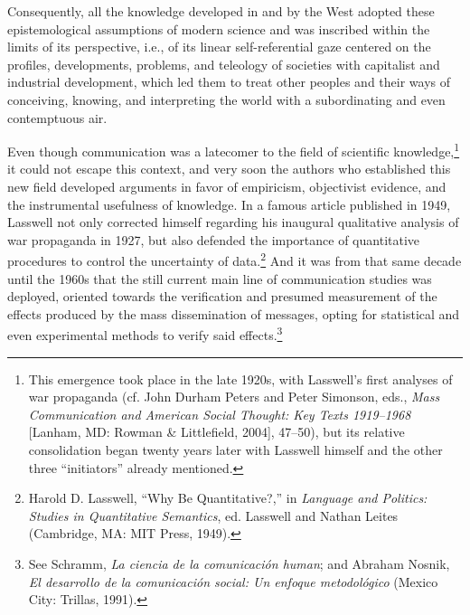 \documentclass{tufte-handout}
\begin{document}
Consequently, all the knowledge developed in and by the West adopted
these epistemological assumptions of modern science and was inscribed
within the limits of its perspective, i.e., of its linear
self-referential gaze centered on the profiles, developments, problems,
and teleology of societies with capitalist and industrial development,
which led them to treat other peoples and their ways of conceiving,
knowing, and interpreting the world with a subordinating and even
contemptuous air.

Even though communication was a latecomer to the field of scientific
knowledge,\footnote{This emergence took place in the late 1920s, with
  Lasswell's first analyses of war propaganda (cf. John Durham Peters
  and Peter Simonson, eds., \emph{Mass Communication and American Social
  Thought: Key Texts 1919--1968} {[}Lanham, MD: Rowman \& Littlefield,
  2004{]}, 47--50), but its relative consolidation began twenty years
  later with Lasswell himself and the other three ``initiators'' already
  mentioned.} it could not escape this context, and very soon the
authors who established this new field developed arguments in favor of
empiricism, objectivist evidence, and the instrumental usefulness of
knowledge. In a famous article published in 1949, Lasswell not only
corrected himself regarding his inaugural qualitative analysis of war
propaganda in 1927, but also defended the importance of quantitative
procedures to control the uncertainty of data.\footnote{Harold D.
  Lasswell, ``Why Be Quantitative?,'' in \emph{Language and Politics:
  Studies in Quantitative Semantics}, ed. Lasswell and Nathan Leites
  (Cambridge, MA: MIT Press, 1949).} And it was from that same decade
until the 1960s that the still current main line of communication
studies was deployed, oriented towards the verification and presumed
measurement of the effects produced by the mass dissemination of
messages, opting for statistical and even experimental methods to verify
said effects.\footnote{See Schramm, \emph{La ciencia de la comunicación
  human}; and Abraham Nosnik, \emph{El desarrollo de la comunicación
  social: Un enfoque metodológico} (Mexico City: Trillas, 1991).}
\end{document}

